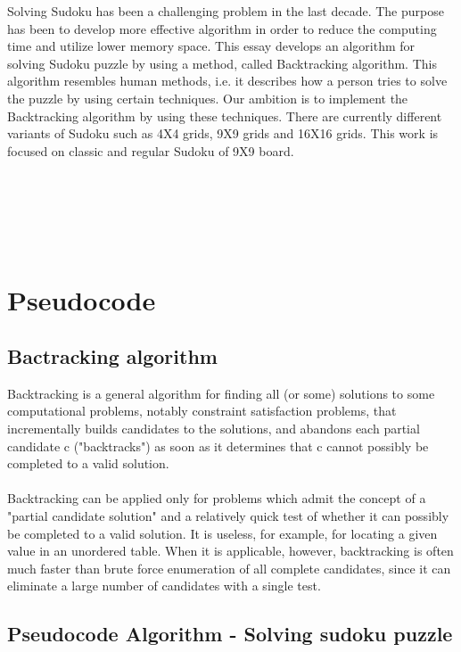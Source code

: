 \documentclass[12pt, letterpaper, twoside]{article}
\begin{document}
        Solving Sudoku has been a challenging problem in the last decade. The purpose has been to
        develop more effective algorithm in order to reduce the computing time and utilize lower
        memory space. This essay develops an algorithm for solving Sudoku puzzle by using a
        method, called Backtracking algorithm. This algorithm resembles human methods, i.e. it
        describes how a person tries to solve the puzzle by using certain techniques. Our ambition is
        to implement the Backtracking algorithm by using these techniques.
        There are currently different variants of Sudoku such as 4X4 grids, 9X9 grids and 16X16
        grids. This work is focused on classic and regular Sudoku of 9X9 board. \\ \\ \\ \\ \\ \\

    \section{Pseudocode}
        \subsection{Bactracking algorithm}
        Backtracking is a general algorithm for finding all (or some) solutions to some computational problems, notably constraint satisfaction problems, that incrementally 	    	 	builds 	    candidates to the solutions, and abandons each partial candidate c ("backtracks") as soon as it determines that c cannot possibly be completed to a valid     		solution. \\ \\
        Backtracking can be applied only for problems which admit the concept of a "partial candidate solution" and a relatively quick test of whether it can possibly be 			completed to a valid solution. It is useless, for example, for locating a given value in an unordered table. When it is applicable, however, backtracking is often much 		faster than brute force enumeration of all complete candidates, since it can eliminate a large number of candidates with a single test.

        \subsection{Pseudocode Algorithm - Solving sudoku puzzle}
\end{document}

